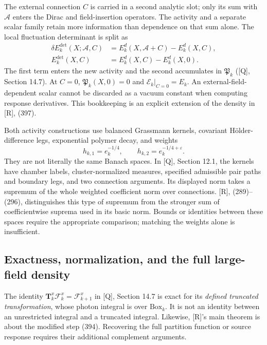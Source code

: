 \documentclass[11pt]{article}
\numberwithin{equation}{section}
\newcommand{\Q}{\textup{[Q]}}
\newcommand{\UR}{\textup{[R]}}
\begin{document}
The external connection $C$ is carried in a second analytic slot;
only its sum with $\mathscr A$ enters the Dirac and field-insertion
operators. The activity and a separate scalar family retain more
information than dependence on that sum alone. The local fluctuation
determinant is split as
\begin{align}
 \delta E_k^{\mathrm{det}}(X;\mathscr A,C)
   &=E_k^d(X,\mathscr A+C)-E_k^d(X,C),\\
 E_k^{\mathrm{det}}(X,C)&=E_k^d(X,C)-E_k^d(X,0).
 \label{eq:digest-source-split}
\end{align}
The first term enters the new activity and the second accumulates
in $\mathfrak P_k$ (\Q, Section 14.7). At $C=0$,
$\mathfrak P_k(X,0)=0$ and $\mathscr E_k|_{C=0}=E_k$.
An external-field-dependent scalar cannot be discarded as a vacuum
constant when computing response derivatives. This bookkeeping is
an explicit extension of the density in \UR, (397).

Both activity constructions use balanced Grassmann kernels,
covariant H\"older-difference legs, exponential polymer decay, and
weights
\begin{equation}
 h_{k,1}=e_k^{-1/4},\qquad h_{k,2}=e_k^{-1/4+\varepsilon}.
\end{equation}
They are not literally the same Banach spaces. In \Q, Section 12.1,
the kernels have chamber labels, cluster-normalized measures,
specified admissible pair paths and boundary legs, and two connection
arguments. Its displayed norm takes a supremum of the whole weighted
coefficient norm over connections. \UR, (289)--(296), distinguishes
this type of supremum from the stronger sum of coefficientwise
suprema used in its basic norm. Bounds or identities between these
spaces require the appropriate comparison; matching the weights
alone is insufficient.

\subsection{Exactness, normalization, and the full large-field density}

The identity
$\mathbf T_k^x\mathscr F_k^x=\mathscr F_{k+1}^x$ in \Q, Section 14.7
is exact for its \emph{defined truncated transformation}, whose
photon integral is over $\mathrm{Box}_k$. It is not an identity between
an unrestricted integral and a truncated integral. Likewise, \UR's
main theorem is about the modified step (394). Recovering the full
partition function or source response requires their additional
complement arguments.
\end{document}
